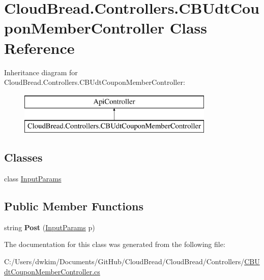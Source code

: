 \hypertarget{class_cloud_bread_1_1_controllers_1_1_c_b_udt_coupon_member_controller}{}\section{Cloud\+Bread.\+Controllers.\+C\+B\+Udt\+Coupon\+Member\+Controller Class Reference}
\label{class_cloud_bread_1_1_controllers_1_1_c_b_udt_coupon_member_controller}
Inheritance diagram for Cloud\+Bread.\+Controllers.\+C\+B\+Udt\+Coupon\+Member\+Controller\+:\begin{figure}[H]
\begin{center}
\leavevmode
\includegraphics[height=2.000000cm]{class_cloud_bread_1_1_controllers_1_1_c_b_udt_coupon_member_controller}
\end{center}
\end{figure}
\subsection*{Classes}
\begin{DoxyCompactItemize}
\item 
class \hyperlink{class_cloud_bread_1_1_controllers_1_1_c_b_udt_coupon_member_controller_1_1_input_params}{Input\+Params}
\end{DoxyCompactItemize}
\subsection*{Public Member Functions}
\begin{DoxyCompactItemize}
\item 
string {\bfseries Post} (\hyperlink{class_cloud_bread_1_1_controllers_1_1_c_b_udt_coupon_member_controller_1_1_input_params}{Input\+Params} p)\hypertarget{class_cloud_bread_1_1_controllers_1_1_c_b_udt_coupon_member_controller_a55a2e1a6013d3916235ccd6054efb91e}{}\label{class_cloud_bread_1_1_controllers_1_1_c_b_udt_coupon_member_controller_a55a2e1a6013d3916235ccd6054efb91e}

\end{DoxyCompactItemize}


The documentation for this class was generated from the following file\+:\begin{DoxyCompactItemize}
\item 
C\+:/\+Users/dwkim/\+Documents/\+Git\+Hub/\+Cloud\+Bread/\+Cloud\+Bread/\+Controllers/\hyperlink{_c_b_udt_coupon_member_controller_8cs}{C\+B\+Udt\+Coupon\+Member\+Controller.\+cs}\end{DoxyCompactItemize}
